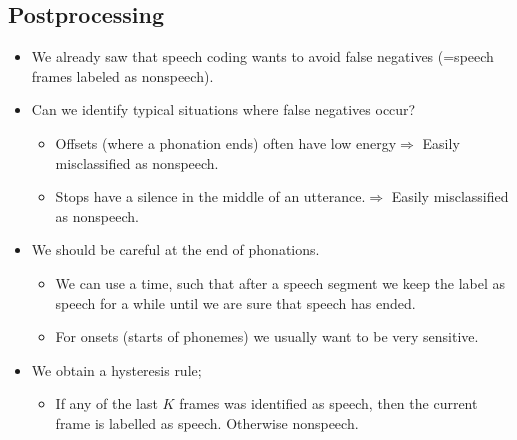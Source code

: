 \documentclass[letterpaper,10pt,english]{jupyterBook}
\begin{document}
\subsection{Post\sphinxhyphen{}processing}
\label{\detokenize{Recognition/Voice_activity_detection:post-processing}}
\sphinxAtStartPar
{}
\begin{itemize}
\item {} 
\sphinxAtStartPar
We already saw that speech coding wants to avoid false negatives
(=speech frames labeled as non\sphinxhyphen{}speech).

\item {} 
\sphinxAtStartPar
Can we identify typical situations where false negatives occur?
\begin{itemize}
\item {} 
\sphinxAtStartPar
Offsets (where a phonation ends) often have low energy\(\Rightarrow\) Easily misclassified as non\sphinxhyphen{}speech.

\item {} 
\sphinxAtStartPar
Stops have a silence in the middle of an utterance.\(\Rightarrow\) Easily misclassified as non\sphinxhyphen{}speech.

\end{itemize}

\item {} 
\sphinxAtStartPar
We should be careful at the end of phonations.
\begin{itemize}
\item {} 
\sphinxAtStartPar
We can use a  time, such that after a speech segment
we keep the label as speech for a while until we are sure that
speech has ended.

\item {} 
\sphinxAtStartPar
For onsets (starts of phonemes) we usually want to be very
sensitive.

\end{itemize}

\item {} 
\sphinxAtStartPar
We obtain a hysteresis rule;
\begin{itemize}
\item {} 
\sphinxAtStartPar
If any of the last \(K\) frames was identified as speech, then the
current frame is labelled as speech. Otherwise non\sphinxhyphen{}speech.

\end{itemize}

\end{itemize}
\end{document}
